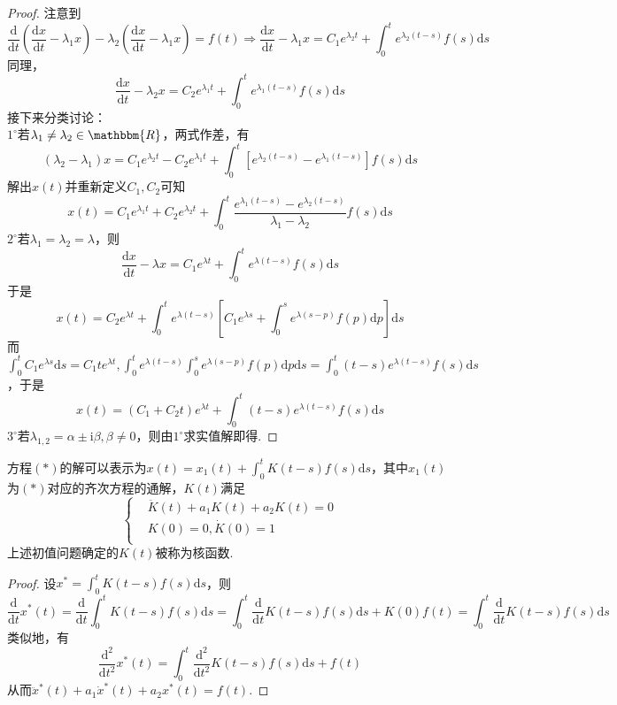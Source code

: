 \documentclass{ctexart}
\begin{document}
\begin{proof}
注意到
$$\frac{\mathrm{d}}{\mathrm{d}t}\left(\frac{\mathrm{d}x}{\mathrm{d}t}-\lambda_{1}x\right)-\lambda_{2}\left(\frac{\mathrm{d}x}{\mathrm{d}t}-\lambda_{1}x\right)=f(t)\Rightarrow \frac{\mathrm{d}x}{\mathrm{d}t}-\lambda_{1}x=C_{1}e^{\lambda_{2}t}+\int_{0}^{t}{e^{\lambda_{2}(t-s)}f(s)\mathrm{d}s}$$
同理，
$$\frac{\mathrm{d}x}{\mathrm{d}t}-\lambda_{2}x=C_{2}e^{\lambda_{1}t}+\int_{0}^{t}{e^{\lambda_{1}(t-s)}f(s)\mathrm{d}s}$$
接下来分类讨论：\\
$1^{\circ}$若$\lambda_{1}\neq \lambda_{2}\in\mathbbm{R}$，两式作差，有
$$(\lambda_{2}-\lambda_{1})x=C_{1}e^{\lambda_{2}t}-C_{2}e^{\lambda_{1}t}+\int_{0}^{t}{\left[e^{\lambda_{2}(t-s)}-e^{\lambda_{1}(t-s)}\right]f(s)\mathrm{d}s}$$
解出$x(t)$并重新定义$C_{1},C_{2}$可知
$$x(t)=C_{1}e^{\lambda_{1}t}+C_{2}e^{\lambda_{2}t}+\int_{0}^{t}{\frac{e^{\lambda_{1}(t-s)}-e^{\lambda_{2}(t-s)}}{\lambda_{1}-\lambda_{2}}f(s)\mathrm{d}s}$$
$2^{\circ}$若$\lambda_{1}=\lambda_{2}=\lambda$，则
$$\frac{\mathrm{d}x}{\mathrm{d}t}-\lambda x=C_{1}e^{\lambda t}+\int_{0}^{t}{e^{\lambda(t-s)}f(s)\mathrm{d}s}$$
于是
$$x(t)=C_{2}e^{\lambda t}+\int_{0}^{t}{e^{\lambda(t-s)}\left[C_{1}e^{\lambda s}+\int_{0}^{s}{e^{\lambda(s-p)}f(p)\mathrm{d}p}\right]\mathrm{d}s}$$
而$\int_{0}^{t}{C_{1}e^{\lambda s}\mathrm{d}s}=C_{1}te^{\lambda t},\int_{0}^{t}{e^{\lambda(t-s)}\int_{0}^{s}{e^{\lambda(s-p)}f(p)\mathrm{d}p}\mathrm{d}s}=\int_{0}^{t}{(t-s)e^{\lambda(t-s)}f(s)\mathrm{d}s}$，于是
$$x(t)=(C_{1}+C_{2}t)e^{\lambda t}+\int_{0}^{t}{(t-s)e^{\lambda(t-s)}f(s)\mathrm{d}s}$$
$3^{\circ}$若$\lambda_{1,2}=\alpha\pm\mathrm{i}\beta,\beta\neq 0$，则由$1^{\circ}$求实值解即得.
\end{proof}

\begin{theorem}
方程$(*)$的解可以表示为$x(t)=x_{1}(t)+\int_{0}^{t}{K(t-s)f(s)\mathrm{d}s}$，其中$x_{1}(t)$为$(*)$对应的齐次方程的通解，$K(t)$满足
$$\left\{\begin{aligned}&\ddot{K}(t)+a_{1}K(t)+a_{2}K(t)=0\\&K(0)=0,\dot{K}(0)=1\\\end{aligned}\right.$$
上述初值问题确定的$K(t)$被称为核函数.
\end{theorem}

\begin{proof}
设$x^{*}=\int_{0}^{t}{K(t-s)f(s)\mathrm{d}s}$，则
$$\frac{\mathrm{d}}{\mathrm{d}t}x^{*}(t)=\frac{\mathrm{d}}{\mathrm{d}t}\int_{0}^{t}{K(t-s)f(s)\mathrm{d}s}=\int_{0}^{t}{\frac{\mathrm{d}}{\mathrm{d}t}K(t-s)f(s)\mathrm{d}s}+K(0)f(t)=\int_{0}^{t}{\frac{\mathrm{d}}{\mathrm{d}t}K(t-s)f(s)\mathrm{d}s}$$
类似地，有
$$\frac{\mathrm{d}^{2}}{\mathrm{d}t^{2}}x^{*}(t)=\int_{0}^{t}{\frac{\mathrm{d}^{2}}{\mathrm{d}t^{2}}K(t-s)f(s)\mathrm{d}s}+f(t)$$
从而$\ddot{x}^{*}(t)+a_{1}\dot{x}^{*}(t)+a_{2}x^{*}(t)=f(t)$.
\end{proof}
\end{document}
